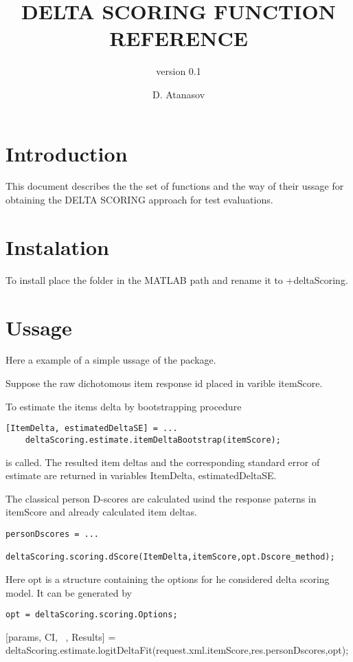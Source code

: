 \documentclass[12pt]{scrartcl}
\title{DELTA SCORING FUNCTION REFERENCE}
\subtitle{version 0.1}
\author{D. Atanasov}
\begin{document}
\maketitle

\section{Introduction}
This document describes the the set of functions and the way of their ussage for obtaining the DELTA SCORING approach for test evaluations.

\section{Instalation}
To install place the folder in the MATLAB path and rename it to +deltaScoring.

\section{Ussage}
Here a example of a simple ussage of the package.

Suppose the raw dichotomous item response id placed in varible itemScore.

To estimate the items delta by bootstrapping procedure

\begin{verbatim}
[ItemDelta, estimatedDeltaSE] = ...
	deltaScoring.estimate.itemDeltaBootstrap(itemScore);
\end{verbatim}

is called. The resulted item deltas and the corresponding standard error of estimate are returned in variables ItemDelta, estimatedDeltaSE.

The classical person D-scores are calculated usind the response paterns in itemScore and already calculated item deltas.

\begin{verbatim}
personDscores = ...
	deltaScoring.scoring.dScore(ItemDelta,itemScore,opt.Dscore_method);
\end{verbatim}

Here opt is a structure containing the options for he considered delta scoring model. It can be generated by

\begin{verbatim}
opt = deltaScoring.scoring.Options;
\end{verbatim}



[params, CI, ~, Results] = deltaScoring.estimate.logitDeltaFit(request.xml.itemScore,res.personDscores,opt);
\end{document}
